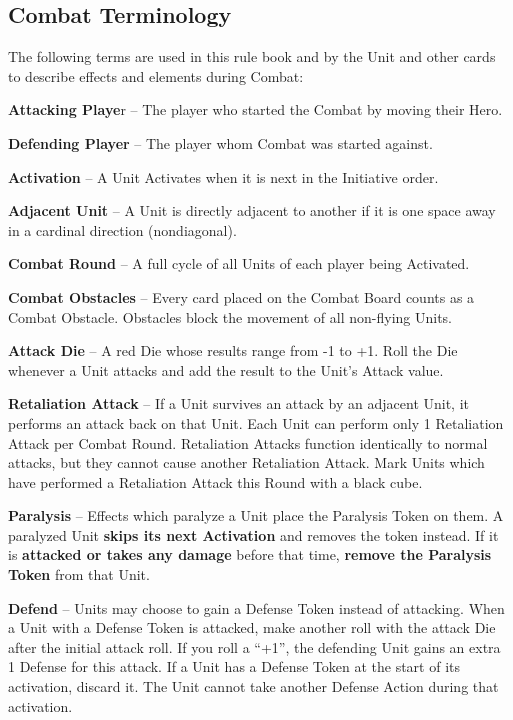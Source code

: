 \begin{multicols}{2}
\vspace*{\fill}

\subsection*{\hypertarget{Combatterminology}{Combat Terminology}}
The following terms are used in this rule book and by the Unit and other cards to describe effects and elements during Combat:\par
\textbf{Attacking Playe}r – The player who started the Combat by moving their Hero.\par
\textbf{Defending Player} – The player whom Combat was started against.\par
\textbf{Activation} – A Unit Activates when it is next in the Initiative order.\par
\textbf{Adjacent Unit} – A Unit is directly adjacent to another if it is one space away in a cardinal direction (nondiagonal).\par
\textbf{Combat Round} – A full cycle of all Units of each player being Activated.\par
\textbf{Combat Obstacles} – Every card placed on the Combat Board counts as a Combat Obstacle.
Obstacles block the movement of all non-flying Units.\par
\textbf{Attack Die} – A red Die whose results range from -1 to +1.
Roll the Die whenever a Unit attacks and
add the result to the Unit's Attack value.\par
\textbf{\hypertarget{Retaliate}{Retaliation Attack}} – If a Unit survives an attack by an adjacent Unit, it performs an attack back on that Unit.
Each Unit can perform only 1 Retaliation Attack per Combat Round.
Retaliation Attacks function identically to normal attacks, but they cannot cause another Retaliation Attack.
Mark Units which have performed a Retaliation Attack this Round with a black cube.\par
\textbf{Paralysis}  – Effects which paralyze a Unit place the Paralysis Token on them.
A paralyzed Unit \textbf{skips its next Activation} and removes the token instead.
If it is \textbf{attacked or takes any damage} before that time, \textbf{remove the Paralysis Token} from that Unit.\par
\textbf{\hypertarget{Defend}{Defend}}  – Units may choose to gain a Defense Token instead of attacking.
When a Unit with a Defense Token is attacked, make another roll with the attack Die
after the initial attack roll.
If you roll a “+1”, the defending Unit gains an extra 1 Defense for this attack.
If a Unit has a Defense Token at the start of its activation, discard it.
The Unit cannot take another Defense Action during that activation.


\end{multicols}
